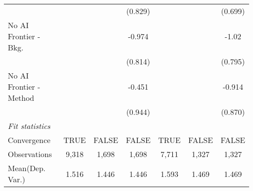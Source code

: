 \begin{tabular}{lcccccc}
                           &               &         & (0.829)    &               &         & (0.699)\\   
   No AI Frontier - Bkg.   &               &         & -0.974     &               &         & -1.02\\   
                           &               &         & (0.814)    &               &         & (0.795)\\   
   No AI Frontier - Method &               &         & -0.451     &               &         & -0.914\\   
                           &               &         & (0.944)    &               &         & (0.870)\\   
   \midrule
   \emph{Fit statistics}\\
   Convergence             &TRUE           & FALSE   & FALSE      & TRUE          & FALSE   & FALSE\\  
   Observations            & 9,318         & 1,698   & 1,698      & 7,711         & 1,327   & 1,327\\  
Mean(Dep. Var.) & 1.516 & 1.446 & 1.446 & 1.593 & 1.469 & 1.469 \\
   

\end{tabular}
